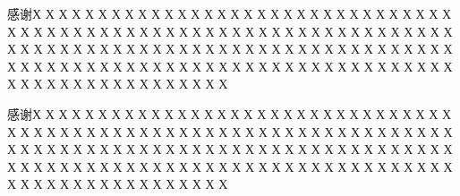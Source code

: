 \begin{acknowledgements}

感谢Х Х Х Х Х Х Х Х Х Х Х Х Х Х Х Х Х Х Х Х Х Х Х Х Х Х Х Х Х Х Х Х Х Х Х Х Х Х Х Х Х Х Х Х Х Х Х Х Х Х Х Х Х Х Х Х Х Х Х Х Х Х Х Х Х Х Х Х Х Х Х Х Х Х Х Х Х Х Х Х Х Х Х Х Х Х Х Х Х Х Х Х Х Х Х Х Х Х Х Х Х Х Х Х Х Х Х Х Х Х Х Х Х Х Х Х Х Х Х Х Х Х Х Х Х Х Х Х Х Х Х Х Х Х Х Х Х Х Х Х Х Х Х Х Х Х Х Х Х Х Х 

感谢Х Х Х Х Х Х Х Х Х Х Х Х Х Х Х Х Х Х Х Х Х Х Х Х Х Х Х Х Х Х Х Х Х Х Х Х Х Х Х Х Х Х Х Х Х Х Х Х Х Х Х Х Х Х Х Х Х Х Х Х Х Х Х Х Х Х Х Х Х Х Х Х Х Х Х Х Х Х Х Х Х Х Х Х Х Х Х Х Х Х Х Х Х Х Х Х Х Х Х Х Х Х Х Х Х Х Х Х Х Х Х Х Х Х Х Х Х Х Х Х Х Х Х Х Х Х Х Х Х Х Х Х Х Х Х Х Х Х Х Х Х Х Х Х Х Х Х Х Х Х Х 

\end{acknowledgements}